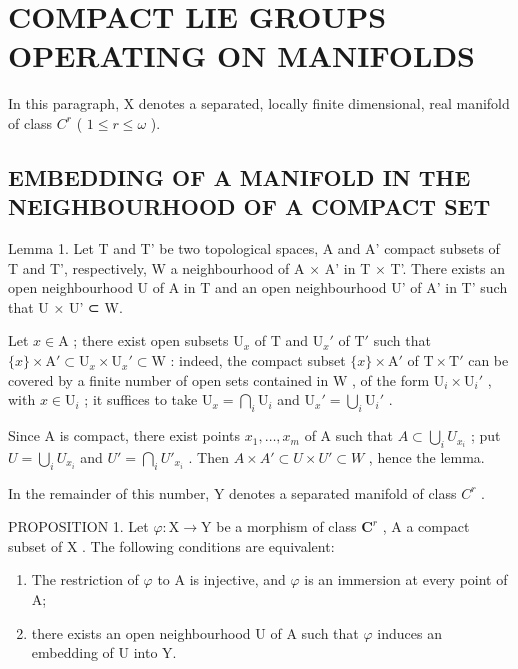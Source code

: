 \section{COMPACT LIE GROUPS OPERATING ON MANIFOLDS}

In this paragraph, X denotes a separated, locally finite dimensional, real manifold of class \(C^{r}\) ( \(1 \leq r \leq \omega\) ).

\subsection{EMBEDDING OF A MANIFOLD IN THE NEIGHBOURHOOD OF A COMPACT SET}

Lemma 1. Let T and T' be two topological spaces, A and A' compact subsets of T and T', respectively, W a neighbourhood of A × A' in T × T'. There exists an open neighbourhood U of A in T and an open neighbourhood U' of A' in T' such that U × U' ⊂ W.

Let \(x \in \mathrm{A}\) ; there exist open subsets \(\mathrm{U}_x\) of \(\mathrm{T}\) and \(\mathrm{U}_x'\) of \(\mathrm{T}'\) such that \(\{x\} \times \mathrm{A}' \subset \mathrm{U}_x \times \mathrm{U}_x' \subset \mathrm{W}\) : indeed, the compact subset \(\{x\} \times \mathrm{A}'\) of \(\mathrm{T} \times \mathrm{T}'\) can be covered by a finite number of open sets contained in \(\mathrm{W}\) , of the form \(\mathrm{U}_i \times \mathrm{U}_i'\) , with \(x \in \mathrm{U}_i\) ; it suffices to take \(\mathrm{U}_x = \bigcap_i \mathrm{U}_i\) and \(\mathrm{U}_x' = \bigcup_i \mathrm{U}_i'\) .

Since A is compact, there exist points \(x_{1},\ldots,x_{m}\) of A such that \(A\subset\bigcup_{i}U_{x_{i}}\) ; put \(U=\bigcup_{i}U_{x_{i}}\) and \(U'=\bigcap_{i}U'_{x_{i}}\) . Then \(A\times A'\subset U\times U'\subset W\) , hence the lemma.

In the remainder of this number, Y denotes a separated manifold of class \(C^{r}\) .

PROPOSITION 1. Let \(\varphi : \mathrm{X} \to \mathrm{Y}\) be a morphism of class \(\mathbf{C}^r\) , A a compact subset of \(\mathrm{X}\) . The following conditions are equivalent:

\begin{enumerate}
\def\labelenumi{(\roman{enumi})}
\item
  The restriction of \(\varphi\) to A is injective, and \(\varphi\) is an immersion at every point of A;
\item
  there exists an open neighbourhood U of A such that \(\varphi\) induces an embedding of U into Y.
\end{enumerate}

